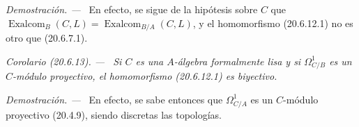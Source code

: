 \documentclass[10pt,oneside]{book}
\makeatletter
\newcommand{\setmanualcurrentlabel}[1]{\def\@currentlabel{#1}}
\newenvironment{corollary}[1][]{%
  \setmanualcurrentlabel{#1}\par\medskip\noindent\itshape Corolario (#1). ---\ }{\par}
\newenvironment{proof}{%
  \par\medskip\noindent\textit{Demostración. ---\ }}{\par}
\makeatother
\begin{document}
\begin{proof}
En efecto, se sigue de la hipótesis sobre $C$ que
$\operatorname{Exalcom}_B(C,L)=\operatorname{Exalcom}_{B/A}(C,L)$, y
el homomorfismo (20.6.12.1) no es otro que (20.6.7.1).
\end{proof}

\begin{corollary}[20.6.13]
\label{0.20.6.13-es}
Si $C$ es una $A$-álgebra formalmente lisa y si $\Omega^1_{C/B}$ es
un $C$-módulo proyectivo, el homomorfismo \textup{(20.6.12.1)} es biyectivo.
\end{corollary}

\begin{proof}
En efecto, se sabe entonces que $\Omega^1_{C/A}$ es un $C$-módulo proyectivo
(20.4.9), siendo discretas las topologías.
\end{proof}
\end{document}
